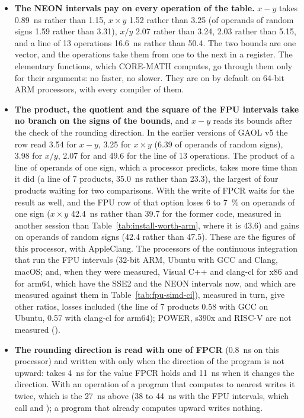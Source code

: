 \begin{itemize}
\item[$\bullet$] \textbf{The NEON intervals pay on every operation of the
  table.} $x - y$ takes 0.89~ns rather than 1.15, $x \times y$ 1.52 rather than 3.25 (of operands of random signs 1.59 rather than 3.31), $x / y$ 2.07 rather than 3.24,  2.03 rather than 5.15, and a line of 13 operations 16.6~ns rather than 50.4. The two bounds are one vector, and the
  operations take them from one to the next in a register. The elementary
  functions, which CORE-MATH computes, go through them only for their
  arguments: no faster, no slower. They are on by default on 64-bit ARM
  processors, with every compiler of them.
\item[$\bullet$] \textbf{The product, the quotient and the square of the FPU
  intervals take no branch on the signs of the bounds}, and $x - y$ reads its
  bounds after the check of the rounding direction.\newinvfive{} In the earlier
  versions of GAOL v5 the row read 3.54 for $x - y$, 3.25 for $x \times y$ (6.39 of operands of random
  signs), 3.98 for $x / y$, 2.07 for  and 49.6 for the line of 13
  operations. The product of a line of operands of one sign, which a processor
  predicts, takes more time than it did (a line of 7 products, 35.0~ns rather
  than 23.3), the largest of four products waiting for two comparisons. With
   the write of FPCR waits for the result as
  well, and the FPU row of that option loses 6 to 7~\% on operands of one sign
  ($x \times y$ 42.4~ns rather than 39.7 for the former code, measured in
  another session than Table~\ref{tab:install-worth-arm}, where it is 43.6)
  and gains on operands of random signs (42.4 rather than 47.5). These are the figures
  of this processor, with AppleClang. The processors of the continuous
  integration that run the FPU intervals (32-bit ARM, Ubuntu with GCC and
  Clang, macOS; and, when they were measured, Visual C++ and clang-cl for x86
  and for arm64, which have the SSE2 and the NEON intervals now, and which are measured against them in Table~\ref{tab:fpu-simd-ci}), measured in turn, give other ratios, losses included (the line of 7 products 0.58 with
  GCC on Ubuntu, 0.57 with clang-cl for arm64); POWER, s390x and RISC-V are
  not measured ().
\item[$\bullet$] \textbf{The rounding direction is read with one 
  of FPCR} (0.8~ns on this processor) and written with  only when
  the direction of the program is not upward:  takes 4~ns for the
  value FPCR holds and 11~ns when it changes the direction. With
   an operation of a program that computes
  to nearest writes it twice, which is the 27~ns above (38 to 44~ns with the FPU
  intervals, which call  and ); a
  program that already computes upward writes nothing.
\end{itemize}

